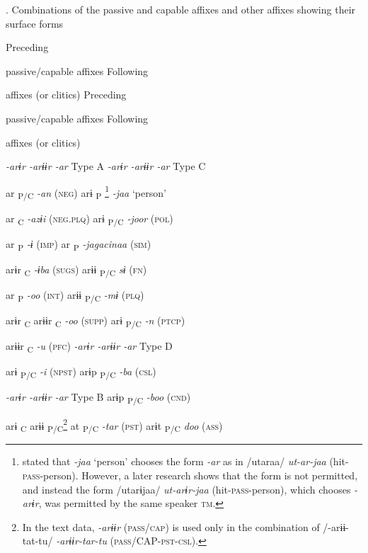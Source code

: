 \begin{table}
\caption{\label{tab:key:65}. Combinations of the passive and capable affixes and other affixes showing their surface forms}

Preceding

passive/capable affixes  Following

affixes (or clitics)    Preceding

passive/capable affixes  Following

affixes (or clitics)

\textit{-arɨr  -arɨɨr  -ar} Type A    \textit{-arɨr  -arɨɨr  -ar} Type C

    ar\textsubscript{ P/C}  \textit{-an} (\textsc{neg})    arɨ\textsubscript{ P}{} \footnote{\citet[70]{Niinaga2010} stated that \textit{-jaa} ‘person’ chooses the form \textit{-ar} as in /utaraa/ \textit{ut-ar-jaa} (hit-\textsc{pass}-person). However, a later research shows that the form is not permitted, and instead the form /utarɨjaa/ \textit{ut-arɨr-jaa} (hit-\textsc{pass}-person), which chooses \textit{-arɨr}, was permitted by the same speaker \textsc{tm}.}      \textit{-jaa} ‘person’

    ar\textsubscript{ C}  \textit{-azɨi} (\textsc{neg}.\textsc{plq})    arɨ\textsubscript{ P/C}      \textit{-joor} (\textsc{pol})

    ar \textsubscript{P}  \textit{-ɨ} (\textsc{imp})        ar\textsubscript{ P}  \textit{-jagacinaa} (\textsc{sim})

arɨr\textsubscript{ C}      \textit{-ɨba} (\textsc{sugs})      arɨɨ\textsubscript{ P/C}    \textit{sɨ}  (\textsc{fn})

    ar\textsubscript{ P}  \textit{-oo} (\textsc{int})      arɨɨ\textsubscript{ P/C}    \textit{-mɨ} (\textsc{plq})

arɨr\textsubscript{ C}  arɨɨr\textsubscript{ C}    \textit{-oo} (\textsc{supp})    arɨ\textsubscript{ P/C}      \textit{-n} (\textsc{ptcp})

  arɨɨr\textsubscript{ C}    \textit{-u} (\textsc{pfc})    \textit{-arɨr  -arɨɨr  -ar} Type D

arɨ\textsubscript{ P/C}      \textit{-i} (\textsc{npst})    arɨp\textsubscript{ P/C}      \textit{-ba} (\textsc{csl})

\textit{-arɨr  -arɨɨr  -ar} Type B    arɨp\textsubscript{ P/C}      \textit{-boo} (\textsc{cnd})

arɨ\textsubscript{ C}  arɨɨ\textsubscript{ P/C}\footnote{In the text data, \textit{-arɨɨr} (\textsc{pass}/\textsc{cap}) is used only in the combination of /-arɨɨ-tat-tu/ \textit{-arɨɨr-tar-tu} (\textsc{pass}/CAP-\textsc{pst}-\textsc{csl}).}  at\textsubscript{ P/C}  \textit{-tar} (\textsc{pst})    arɨt\textsubscript{ P/C}      \textit{doo}  (\textsc{ass})


\end{table}
